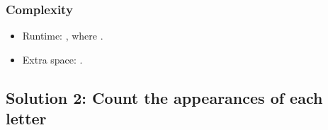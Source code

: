 \documentclass[letterpaper,12pt,english]{book}
\begin{document}
\subsubsection{Complexity}
\label{\detokenize{String/08_STR_242_Valid_Anagram:complexity}}\begin{itemize}
\item {} 
\sphinxAtStartPar
Runtime: , where .

\item {} 
\sphinxAtStartPar
Extra space: .

\end{itemize}


\subsection{Solution 2: Count the appearances of each letter}
\label{\detokenize{String/08_STR_242_Valid_Anagram:solution-2-count-the-appearances-of-each-letter}}
\end{document}

